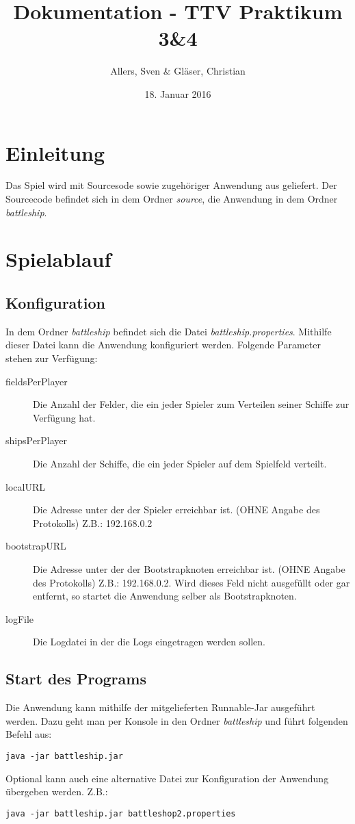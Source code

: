 \documentclass[a4paper]{article}
\title{Dokumentation - TTV Praktikum 3\&4}
\author{Allers, Sven \& Gläser, Christian}
\date{18. Januar 2016}
\begin{document}
\maketitle

\section{Einleitung}
Das Spiel wird mit Sourcesode sowie zugehöriger Anwendung aus geliefert. Der Sourcecode befindet sich in dem Ordner \textit{source}, die Anwendung in dem Ordner \textit{battleship}.
\section{Spielablauf}
\subsection{Konfiguration}
In dem Ordner \textit{battleship} befindet sich die Datei \textit{battleship.properties}. Mithilfe dieser Datei kann die Anwendung konfiguriert werden. Folgende Parameter stehen zur Verfügung:
\begin{description}
	\item[fieldsPerPlayer] Die Anzahl der Felder, die ein jeder Spieler zum Verteilen seiner Schiffe zur Verfügung hat.
	\item[shipsPerPlayer] Die Anzahl der Schiffe, die ein jeder Spieler auf dem Spielfeld verteilt.
	\item[localURL] Die Adresse unter der der Spieler erreichbar ist. (OHNE Angabe des Protokolls) Z.B.: 192.168.0.2
	\item[bootstrapURL] Die Adresse unter der der Bootstrapknoten erreichbar ist. (OHNE Angabe des Protokolls) Z.B.: 192.168.0.2. Wird dieses Feld nicht ausgefüllt oder gar entfernt, so startet die Anwendung selber als Bootstrapknoten. 
	\item[logFile] Die Logdatei in der die Logs eingetragen werden sollen.
\end{description}

\subsection{Start des Programs}
Die Anwendung kann mithilfe der mitgelieferten Runnable-Jar ausgeführt werden. Dazu geht man per Konsole in den Ordner \textit{battleship} und führt folgenden Befehl aus:
\begin{lstlisting}
java -jar battleship.jar
\end{lstlisting}
Optional kann auch eine alternative Datei zur Konfiguration der Anwendung übergeben werden. Z.B.:
\begin{lstlisting}
java -jar battleship.jar battleshop2.properties
\end{lstlisting}
\end{document}
